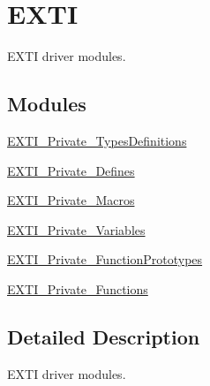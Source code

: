 \hypertarget{group___e_x_t_i}{\section{E\-X\-T\-I}
\label{group___e_x_t_i}
}


E\-X\-T\-I driver modules.  


\subsection*{Modules}
\begin{DoxyCompactItemize}
\item 
\hyperlink{group___e_x_t_i___private___types_definitions}{E\-X\-T\-I\-\_\-\-Private\-\_\-\-Types\-Definitions}
\item 
\hyperlink{group___e_x_t_i___private___defines}{E\-X\-T\-I\-\_\-\-Private\-\_\-\-Defines}
\item 
\hyperlink{group___e_x_t_i___private___macros}{E\-X\-T\-I\-\_\-\-Private\-\_\-\-Macros}
\item 
\hyperlink{group___e_x_t_i___private___variables}{E\-X\-T\-I\-\_\-\-Private\-\_\-\-Variables}
\item 
\hyperlink{group___e_x_t_i___private___function_prototypes}{E\-X\-T\-I\-\_\-\-Private\-\_\-\-Function\-Prototypes}
\item 
\hyperlink{group___e_x_t_i___private___functions}{E\-X\-T\-I\-\_\-\-Private\-\_\-\-Functions}
\end{DoxyCompactItemize}


\subsection{Detailed Description}
E\-X\-T\-I driver modules. 